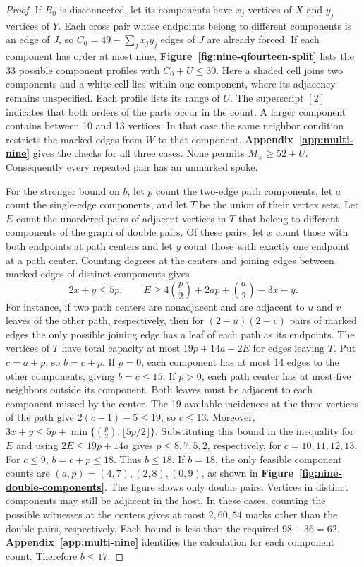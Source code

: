 \begin{proof}
If $B_0$ is disconnected, let its components have $x_j$ vertices of
$X$ and $y_j$ vertices of $Y$. Each cross pair whose endpoints belong
to different components is an edge of $J$, so
$C_0=49-\sum_jx_jy_j$ edges of $J$ are already forced.
If each component has order at most nine,
\textbf{Figure~\ref{fig:nine-qfourteen-split}} lists the 33 possible
component profiles with $C_0+U\leq30$. Here a shaded cell joins two
components and a white cell lies within one component, where its
adjacency remains unspecified. Each profile lists its range of $U$.
The superscript $[2]$ indicates that both orders of the parts occur in
the count. A larger component contains between 10 and 13 vertices.
In that case the same neighbor condition restricts the marked edges
from $W$ to that component. \textbf{Appendix~\ref{app:multi-nine}}
gives the checks for all three cases. None permits $M_\times\geq52+U$.
Consequently every repeated pair has an unmarked spoke.

\FloatBarrier

For the stronger bound on $b$, let $p$ count the two-edge
path components, let $a$ count the single-edge components,
and let $T$ be the union of their vertex sets. Let $E$ count the
unordered pairs of adjacent vertices in $T$ that belong to different
components of the graph of double pairs. Of these pairs, let $x$
count those with both endpoints at path centers and let $y$ count
those with exactly one endpoint at a path center.
Counting degrees at the centers and joining edges between
marked edges of distinct components gives
\[
 2x+y\le5p,\qquad
 E\ge4\binom{p}{2}+2ap+\binom{a}{2}-3x-y.
\]
For instance, if two path centers are nonadjacent and are
adjacent to $u$ and $v$ leaves of the other path, respectively,
then for $(2-u)(2-v)$ pairs of marked edges the only possible
joining edge has a leaf of each path as its endpoints. The vertices of $T$ have
total capacity at most $19p+14a-2E$ for edges leaving $T$.
Put $c=a+p$, so $b=c+p$. If $p=0$, each component has at most
14 edges to the other components, giving $b=c\leq15$. If $p>0$,
each path center has at most five neighbors outside its component.
Both leaves must be adjacent to each component missed by the center.
The 19 available incidences at the three vertices of the path give
$2(c-1)-5\leq19$, so $c\leq13$. Moreover,
$3x+y\leq5p+\min\{\binom{p}{2},\lfloor5p/2\rfloor\}$.
Substituting this bound in the inequality for $E$ and using
$2E\leq19p+14a$ gives $p\leq8,7,5,2$, respectively, for
$c=10,11,12,13$. For $c\leq9$, $b=c+p\leq18$. Thus $b\leq18$.
If $b=18$, the only feasible component counts are
$(a,p)=(4,7),(2,8),(0,9)$, as shown in
\textbf{Figure~\ref{fig:nine-double-components}}. The figure shows
only double pairs. Vertices in distinct components may still be
adjacent in the host. In these cases, counting the
possible witnesses at the centers gives at most $2,60,54$
marks other than the double pairs, respectively. Each bound
is less than the required $98-36=62$.
\textbf{Appendix~\ref{app:multi-nine}} identifies the calculation
for each component count. Therefore $b\leq17$.



\end{proof}
